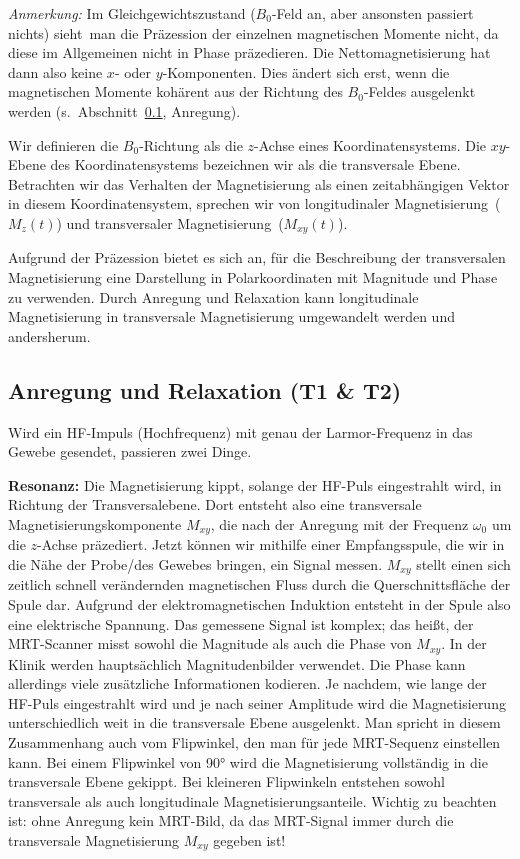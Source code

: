\documentclass[a4paper,11pt]{article}
\newcommand{\Mxy}{M_{xy}}
\begin{document}
\emph{Anmerkung:} Im Gleichgewichtszustand (\glqq $B_0$-Feld an, aber ansonsten passiert nichts\grqq) \glqq sieht\grqq\ man die Präzession der einzelnen magnetischen Momente nicht, da diese im Allgemeinen nicht in Phase präzedieren. Die Nettomagnetisierung hat dann also keine $x$- oder $y$-Komponenten. Dies ändert sich erst, wenn die magnetischen Momente kohärent aus der Richtung des $B_0$-Feldes ausgelenkt werden (s.\ Abschnitt~\ref{sec:anregung}, Anregung).

Wir definieren die $B_0$-Richtung als die $z$-Achse eines Koordinatensystems. Die $xy$-Ebene des Koordinatensystems bezeichnen wir als die transversale Ebene. Betrachten wir das Verhalten der Magnetisierung als einen zeitabhängigen Vektor in diesem Koordinatensystem, sprechen wir von \glqq longitudinaler Magnetisierung\grqq\ ($M_z(t)$) und \glqq transversaler Magnetisierung\grqq\ ($\Mxy(t)$).

Aufgrund der Präzession bietet es sich an, für die Beschreibung der transversalen Magnetisierung eine Darstellung in Polarkoordinaten mit Magnitude und Phase zu verwenden. Durch Anregung und Relaxation kann longitudinale Magnetisierung in transversale Magnetisierung umgewandelt werden und andersherum.

\subsection{Anregung und Relaxation (T1 \& T2)}\label{sec:anregung}
Wird ein HF-Impuls (Hochfrequenz) mit genau der Larmor-Frequenz in das Gewebe gesendet, passieren zwei Dinge.

\textbf{Resonanz:} Die Magnetisierung kippt, solange der HF-Puls eingestrahlt wird, in Richtung der Transversalebene. Dort entsteht also eine transversale Magnetisierungskomponente $\Mxy$, die nach der Anregung mit der Frequenz $\omega_0$ um die $z$-Achse präzediert. Jetzt können wir mithilfe einer Empfangsspule, die wir in die Nähe der Probe/des Gewebes bringen, ein Signal messen. $\Mxy$ stellt einen sich zeitlich schnell verändernden magnetischen Fluss durch die Querschnittsfläche der Spule dar. Aufgrund der elektromagnetischen Induktion entsteht in der Spule also eine elektrische Spannung. Das gemessene Signal ist komplex; das heißt, der MRT-Scanner misst sowohl die Magnitude als auch die Phase von $\Mxy$. In der Klinik werden hauptsächlich Magnitudenbilder verwendet. Die Phase kann allerdings viele zusätzliche Informationen kodieren. Je nachdem, wie lange der HF-Puls eingestrahlt wird und je nach seiner Amplitude wird die Magnetisierung unterschiedlich weit in die transversale Ebene ausgelenkt. Man spricht in diesem Zusammenhang auch vom \glqq Flipwinkel\grqq, den man für jede MRT-Sequenz einstellen kann. Bei einem Flipwinkel von 90° wird die Magnetisierung vollständig in die transversale Ebene gekippt. Bei kleineren Flipwinkeln entstehen sowohl transversale als auch longitudinale Magnetisierungsanteile. Wichtig zu beachten ist: ohne Anregung kein MRT-Bild, da das MRT-Signal immer durch die transversale Magnetisierung $\Mxy$ gegeben ist!
\end{document}
